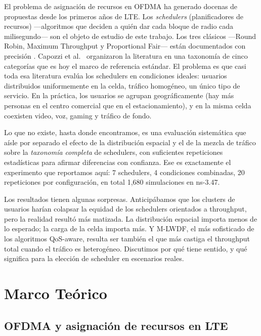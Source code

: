 \documentclass[conference]{IEEEtran}
\begin{document}
El problema de asignación de recursos en OFDMA ha generado docenas de propuestas
desde los primeros años de LTE. Los \emph{schedulers} (planificadores de recursos)
---algoritmos que deciden a quién dar cada bloque de radio cada milisegundo--- son el
objeto de estudio de este trabajo. Los tres clásicos ---Round Robin, Maximum Throughput
y Proportional Fair--- están documentados con precisión \cite{pf1999}. Capozzi et
al.~\cite{capozzi2012} organizaron la literatura en una taxonomía de cinco categorías
que es hoy el marco de referencia estándar. El problema es que casi toda esa literatura
evalúa los schedulers en condiciones ideales: usuarios distribuidos uniformemente en la
celda, tráfico homogéneo, un único tipo de servicio. En la práctica, los usuarios se
agrupan geográficamente (hay más personas en el centro comercial que en el
estacionamiento), y en la misma celda coexisten video, voz, gaming y tráfico de fondo.

Lo que no existe, hasta donde encontramos, es una evaluación sistemática que aísle
por separado el efecto de la distribución espacial y el de la mezcla de tráfico sobre
la \emph{taxonomía completa} de schedulers, con suficientes repeticiones estadísticas
para afirmar diferencias con confianza. Ese es exactamente el experimento que reportamos
aquí: 7 schedulers, 4 condiciones combinadas, 20 repeticiones por configuración, en
total 1{,}680 simulaciones en ns-3.47.

Los resultados tienen algunas sorpresas. Anticipábamos que los clusters de usuarios
harían colapsar la equidad de los schedulers orientados a throughput, pero la realidad
resultó más matizada. La distribución espacial importa menos de lo esperado; la carga
de la celda importa más. Y M-LWDF, el más sofisticado de los algoritmos QoS-aware,
resulta ser también el que más castiga el throughput total cuando el tráfico es
heterogéneo. Discutimos por qué tiene sentido, y qué significa para la elección de
scheduler en escenarios reales.

\section{Marco Teórico}
\label{sec:marco}

\subsection{OFDMA y asignación de recursos en LTE}
\end{document}
